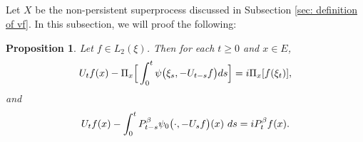 \documentclass[12pt]{amsart}
\theoremstyle{plain}
\newtheorem{prop}[thm]{Proposition}
\theoremstyle{definition}
\numberwithin{equation}{section}
\begin{document}
\subsection{}
	Let $X$ be the non-persistent superprocess discussed in Subsection \ref{sec: definition of vf}. 
	In this subsection, we will proof the following:
	\begin{prop}
\label{prop: complex FKPP-equation}
    Let $f\in L_2(\xi)$. Then for each $t\geq 0$ and $x\in E$,
\begin{equation}
\label{eq: complex FKPP-equation}
    U_tf(x) - \Pi_x \Big[\int_0^t \psi\big(\xi_s, - U_{t-s}f\big) ds \Big]
    \\= i \Pi_x [f(\xi_t)],
\end{equation}
and
\begin{equation}
\label{eq: complex FKPP-equation with FK-transform}
    U_tf(x) -  \int_0^t P_{t-s}^{\beta} \psi_0\big(\cdot,-U_sf\big) (x)~ds
    \\= iP_t^\beta f(x).
\end{equation}
\end{prop} 
\end{document}
